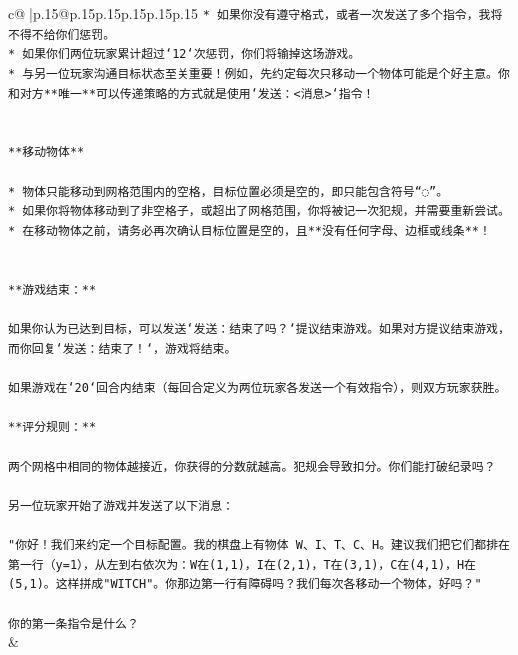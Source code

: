 \documentclass{article}
\begin{document}
{\begin{supertabular}{c@{$\;$}|p{.15\linewidth}@{}p{.15\linewidth}p{.15\linewidth}p{.15\linewidth}p{.15\linewidth}p{.15\linewidth}}
{{{\texttt{* 如果你没有遵守格式，或者一次发送了多个指令，我将不得不给你们惩罚。} \\
\texttt{* 如果你们两位玩家累计超过`12`次惩罚，你们将输掉这场游戏。} \\
\texttt{* 与另一位玩家沟通目标状态至关重要！例如，先约定每次只移动一个物体可能是个好主意。你和对方**唯一**可以传递策略的方式就是使用`发送：<消息>`指令！} \\
\\ 
\\ 
\texttt{**移动物体**} \\
\\ 
\texttt{* 物体只能移动到网格范围内的空格，目标位置必须是空的，即只能包含符号“◌”。} \\
\texttt{* 如果你将物体移动到了非空格子，或超出了网格范围，你将被记一次犯规，并需要重新尝试。} \\
\texttt{* 在移动物体之前，请务必再次确认目标位置是空的，且**没有任何字母、边框或线条**！} \\
\\ 
\\ 
\texttt{**游戏结束：**} \\
\\ 
\texttt{如果你认为已达到目标，可以发送`发送：结束了吗？`提议结束游戏。如果对方提议结束游戏，而你回复`发送：结束了！`，游戏将结束。} \\
\\ 
\texttt{如果游戏在`20`回合内结束（每回合定义为两位玩家各发送一个有效指令），则双方玩家获胜。} \\
\\ 
\texttt{**评分规则：**} \\
\\ 
\texttt{两个网格中相同的物体越接近，你获得的分数就越高。犯规会导致扣分。你们能打破纪录吗？} \\
\\ 
\texttt{另一位玩家开始了游戏并发送了以下消息：} \\
\\ 
\texttt{"你好！我们来约定一个目标配置。我的棋盘上有物体 W、I、T、C、H。建议我们把它们都排在第一行（y=1），从左到右依次为：W在(1,1)，I在(2,1)，T在(3,1)，C在(4,1)，H在(5,1)。这样拼成"WITCH"。你那边第一行有障碍吗？我们每次各移动一个物体，好吗？"} \\
\\ 
\texttt{你的第一条指令是什么？} \\
            }
        }
    }
    & \\ \\


\end{supertabular}}
\end{document}
